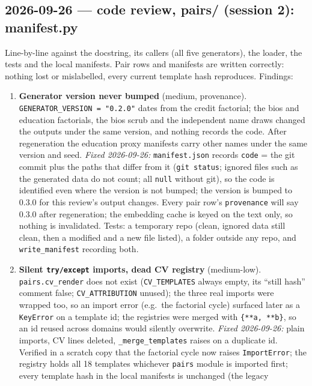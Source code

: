 \documentclass{article}
\begin{document}
\subsection*{2026-09-26 --- code review, pairs/ (session 2): manifest.py}
Line-by-line against the docstring, its callers (all five generators), the loader, the tests and the local
manifests. Pair rows and manifests are written correctly: nothing lost or mislabelled, every current template hash
reproduces. Findings:
\begin{enumerate}
  \item \textbf{Generator version never bumped} (medium, provenance). \texttt{GENERATOR\_VERSION = "0.2.0"} dates
        from the credit factorial; the bios and education factorials, the bios scrub and the independent name
        draws changed the outputs under the same version, and nothing records the code. After regeneration the
        education proxy manifests carry other names under the same version and seed. \emph{Fixed 2026-09-26:}
        \texttt{manifest.json} records \texttt{code} = the git commit plus the paths that differ from it
        (\texttt{git status}; ignored files such as the generated data do not count; all \texttt{null} without
        git), so the code is identified even where the version is not bumped; the version is bumped to 0.3.0
        for this review's output changes. Every pair row's \texttt{provenance} will say 0.3.0 after regeneration;
        the embedding cache is keyed on the text only, so nothing is invalidated. Tests: a temporary repo (clean,
        ignored data still clean, then a modified and a new file listed), a folder outside any repo, and
        \texttt{write\_manifest} recording both.
  \item \textbf{Silent \texttt{try/except} imports, dead CV registry} (medium-low). \texttt{pairs.cv\_render} does not
        exist (\texttt{CV\_TEMPLATES} always empty, its ``still hash'' comment false; \texttt{CV\_ATTRIBUTION} unused);
        the three real imports were wrapped too, so an import error (e.g.\ the factorial cycle) surfaced later as a
        \texttt{KeyError} on a template id; the registries were merged with \texttt{\{**a, **b\}}, so an id reused
        across domains would silently overwrite. \emph{Fixed 2026-09-26:} plain imports, CV lines deleted,
        \texttt{\_merge\_templates} raises on a duplicate id. Verified in a scratch copy that the factorial cycle
        now raises \texttt{ImportError}; the registry holds all 18 templates whichever \texttt{pairs} module is
        imported first; every template hash in the local manifests is unchanged (the legacy

\end{enumerate}
\end{document}
